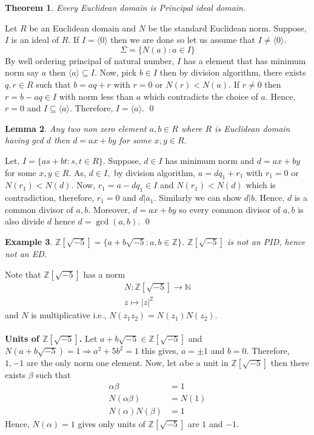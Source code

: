\documentclass[11pt]{amsart}
\newtheorem{theorem}{Theorem}[section]
\newtheorem{eg}[theorem]{Example}
\newtheorem{lemma}[theorem]{Lemma}%
\newcommand{\ZZ}{\mathbb Z}
\newcommand{\NN}{\mathbb N}
\newcommand{\gen}[1]{\langle#1\rangle}
\begin{document}
\begin{theorem}
Every Euclidean domain is Principal ideal domain.
\end{theorem}
\proof Let $R$ be an Euclidean domain and $N$ be the standard Euclidean norm. Suppose, $I$ is an ideal of $R$. If $I=\gen{0}$ then we are done so let us assume that $I\neq \gen{0}.$ $$\Sigma=\{N(a):a\in I\}$$
By well ordering principal of natural number, $I$ has a element that has minimum norm say $a$ then $\gen{a}\subseteq I.$ Now, pick $b\in I$ then by division algorithm, there exists $q,r\in R$ such that $b=aq+r$ with $r=0$ or $N(r)<N(a).$ If $r\neq 0$ then $r=b-aq\in I$ with norm less than $a$ which contradicts the choice of $a$. Hence, $r=0$ and $I\subseteq \gen{a}.$ Therefore, $I=\gen{a}.$ \qed
\begin{lemma}
Any two non zero element $a,b\in R$ where $R$ is Euclidean domain having gcd $d$ then $d=ax+by$ for some $x,y\in R.$
\end{lemma}
\proof Let, $I=\{as+bt:s,t\in R\}$. Suppose, $d\in I$ has minimum norm and $d=ax+by$ for some $x,y\in R.$ As, $d\in I,$ by division algorithm, $a=dq_1+r_1$ with $r_1=0$ or $N(r_1)<N(d).$ Now, $r_1=a-dq_1\in I$ and $N(r_1)<N(d)$ which is contradiction, therefore, $r_1=0$ and $d|a_1$. Similarly we can show $d|b.$ Hence, $d$ is a common divisor of $a,b.$ Moreover, $d=ax+by$ so every common divisor of $a,b$ is also divide $d$ hence $d=\gcd (a,b).$ \qed
\begin{eg}
${\ZZ}[\sqrt{-5}]=\{a+b\sqrt{-5}:a,b\in {\ZZ}\}$. ${\ZZ}[\sqrt{-5}]$ is not an PID, hence not an ED.
\end{eg}
Note that ${\ZZ}[\sqrt{-5}]$ has a norm \begin{align*}
N:{\ZZ}[\sqrt{-5}]\to {\NN}\\
z\mapsto |z|^2
\end{align*}
and $N$ is multiplicative i.e., $N(z_1z_2)=N(z_1)N(z_2).$\\\\
\textbf{Units of ${\ZZ}[\sqrt{-5}]$.} Let $a+b\sqrt{-5}\in {\ZZ}[\sqrt{-5}]$ and $N(a+b\sqrt{-5})=1 \Rightarrow a^2+5b^2=1$ this gives, $a=\pm 1$ and $b=0.$ Therefore, $1,-1$ are the only norm one element. Now, let $\alpha$be a unit in ${\ZZ}[\sqrt{-5}]$ then there exists $\beta$ such that \begin{align*}
\alpha\beta&=1\\
N(\alpha\beta)&=N(1)\\
N(\alpha)N(\beta)&=1
\end{align*}
Hence, $N(\alpha)=1$ gives only units of ${\ZZ}[\sqrt{-5}]$ are $1$ and $-1$.
\end{document}
